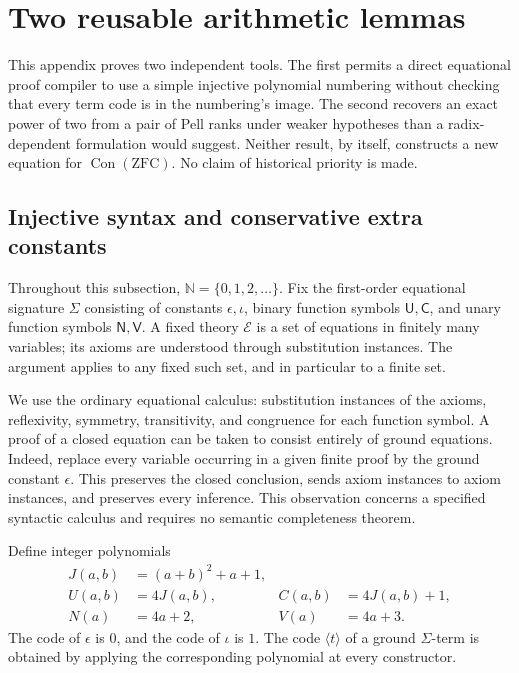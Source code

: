 \newtheorem{auxsyntaxthm}{Theorem}[section]
\newtheorem{auxsyntaxlem}[auxsyntaxthm]{Lemma}
\newtheorem{auxsyntaxprop}[auxsyntaxthm]{Proposition}

\section{Two reusable arithmetic lemmas}
\label{sec:reusable-arithmetic-lemmas}

This appendix proves two independent tools.  The first permits a direct
equational proof compiler to use a simple injective polynomial numbering
without checking that every term code is in the numbering's image.  The
second recovers an exact power of two from a pair of Pell ranks under
weaker hypotheses than a radix-dependent formulation would suggest.
Neither result, by itself, constructs a new equation for
$\operatorname{Con}(\mathrm{ZFC})$.  No claim of historical priority is made.

\subsection{Injective syntax and conservative extra constants}

Throughout this subsection, $\mathbb N=\{0,1,2,\ldots\}$.  Fix the
first-order equational signature $\Sigma$ consisting of constants
$\epsilon,\iota$, binary function symbols $\mathsf U,\mathsf C$, and unary
function symbols $\mathsf N,\mathsf V$.  A fixed theory $\mathcal E$ is a
set of equations in finitely many variables; its axioms are understood
through substitution instances.  The argument applies to any fixed such
set, and in particular to a finite set.

We use the ordinary equational calculus: substitution instances of the
axioms, reflexivity, symmetry, transitivity, and congruence for each
function symbol.  A proof of a closed equation can be taken to consist
entirely of ground equations.  Indeed, replace every variable occurring
in a given finite proof by the ground constant $\epsilon$.  This preserves
the closed conclusion, sends axiom instances to axiom instances, and
preserves every inference.  This observation concerns a specified
syntactic calculus and requires no semantic completeness theorem.

Define integer polynomials
\begin{align}
 J(a,b)&=(a+b)^2+a+1,\\
 U(a,b)&=4J(a,b),& C(a,b)&=4J(a,b)+1,\\
 N(a)&=4a+2,& V(a)&=4a+3.
\end{align}
The code of $\epsilon$ is $0$, and the code of $\iota$ is $1$.
The code $\langle t\rangle$ of a ground $\Sigma$-term is obtained by
applying the corresponding polynomial at every constructor.

